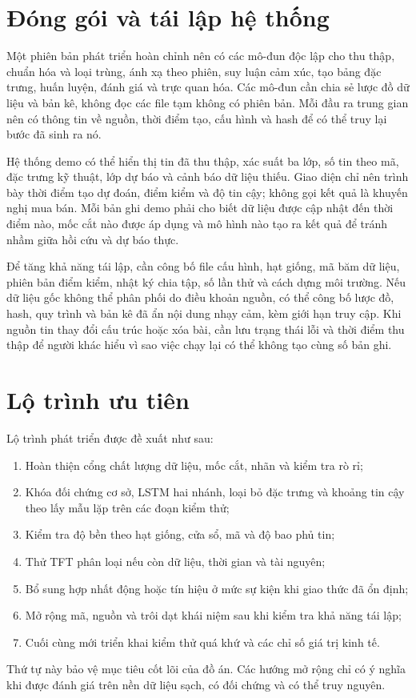 \section{Đóng gói và tái lập hệ thống}

Một phiên bản phát triển hoàn chỉnh nên có các mô-đun độc lập cho thu thập, chuẩn hóa
và loại trùng, ánh xạ theo phiên, suy luận cảm xúc, tạo bảng đặc trưng, huấn luyện,
đánh giá và trực quan hóa. Các mô-đun cần chia sẻ lược đồ dữ liệu và bản kê, không đọc
các file tạm không có phiên bản. Mỗi đầu ra trung gian nên có thông tin về nguồn, thời
điểm tạo, cấu hình và hash để có thể truy lại bước đã sinh ra nó.

Hệ thống demo có thể hiển thị tin đã thu thập, xác suất ba lớp, số tin theo mã, đặc
trưng kỹ thuật, lớp dự báo và cảnh báo dữ liệu thiếu. Giao diện chỉ nên trình bày thời
điểm tạo dự đoán, điểm kiểm và độ tin cậy; không gọi kết quả là khuyến nghị mua bán.
Mỗi bản ghi demo phải cho biết dữ liệu được cập nhật đến thời điểm nào, mốc cắt nào được
áp dụng và mô hình nào tạo ra kết quả để tránh nhầm giữa hồi cứu và dự báo thực.

Để tăng khả năng tái lập, cần công bố file cấu hình, hạt giống, mã băm dữ liệu, phiên bản
điểm kiểm, nhật ký chia tập, số lần thử và cách dựng môi trường. Nếu dữ liệu gốc không
thể phân phối do điều khoản nguồn, có thể công bố lược đồ, hash, quy trình và bản kê đã
ẩn nội dung nhạy cảm, kèm giới hạn truy cập. Khi nguồn tin thay đổi cấu trúc hoặc xóa
bài, cần lưu trạng thái lỗi và thời điểm thu thập để người khác hiểu vì sao việc chạy
lại có thể không tạo cùng số bản ghi.

\section{Lộ trình ưu tiên}

Lộ trình phát triển được đề xuất như sau:

\begin{enumerate}[nosep]
  \item Hoàn thiện cổng chất lượng dữ liệu, mốc cắt, nhãn và kiểm tra rò rỉ;
  \item Khóa đối chứng cơ sở, LSTM hai nhánh, loại bỏ đặc trưng và khoảng tin cậy theo lấy mẫu lặp trên các đoạn kiểm thử;
  \item Kiểm tra độ bền theo hạt giống, cửa sổ, mã và độ bao phủ tin;
  \item Thử TFT phân loại nếu còn dữ liệu, thời gian và tài nguyên;
  \item Bổ sung hợp nhất động hoặc tín hiệu ở mức sự kiện khi giao thức đã ổn định;
  \item Mở rộng mã, nguồn và trôi dạt khái niệm sau khi kiểm tra khả năng tái lập;
  \item Cuối cùng mới triển khai kiểm thử quá khứ và các chỉ số giá trị kinh tế.
\end{enumerate}

Thứ tự này bảo vệ mục tiêu cốt lõi của đồ án. Các hướng mở rộng chỉ có ý nghĩa khi
được đánh giá trên nền dữ liệu sạch, có đối chứng và có thể truy nguyên.
